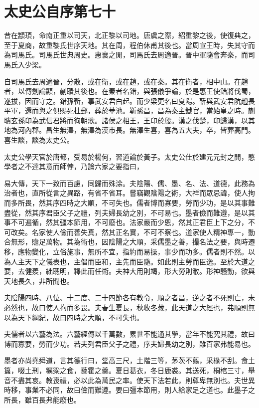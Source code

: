 \chapter{太史公自序第七十}

昔在顓頊，命南正重以司天，北正黎以司地。唐虞之際，紹重黎之後，使復典之，至于夏商，故重黎氏世序天地。其在周，程伯休甫其後也。當周宣王時，失其守而為司馬氏。司馬氏世典周史。惠襄之閒，司馬氏去周適晉。晉中軍隨會奔秦，而司馬氏入少梁。

自司馬氏去周適晉，分散，或在衛，或在趙，或在秦。其在衛者，相中山。在趙者，以傳劍論顯，蒯聵其後也。在秦者名錯，與張儀爭論，於是惠王使錯將伐蜀，遂拔，因而守之。錯孫靳，事武安君白起。而少梁更名曰夏陽。靳與武安君阬趙長平軍，還而與之俱賜死杜郵，葬於華池。靳孫昌，昌為秦主鐵官，當始皇之時。蒯聵玄孫卬為武信君將而徇朝歌。諸侯之相王，王卬於殷。漢之伐楚，卬歸漢，以其地為河內郡。昌生無澤，無澤為漢市長。無澤生喜，喜為五大夫，卒，皆葬高門。喜生談，談為太史公。

太史公學天官於唐都，受易於楊何，習道論於黃子。太史公仕於建元元封之閒，愍學者之不達其意而師悖，乃論六家之要指曰，

易大傳，天下一致而百慮，同歸而殊涂。夫陰陽、儒、墨、名、法、道德，此務為治者也，直所從言之異路，有省不省耳。嘗竊觀陰陽之術，大祥而眾忌諱，使人拘而多所畏，然其序四時之大順，不可失也。儒者博而寡要，勞而少功，是以其事難盡從，然其序君臣父子之禮，列夫婦長幼之別，不可易也。墨者儉而難遵，是以其事不可遍循，然其彊本節用，不可廢也。法家嚴而少恩，然其正君臣上下之分，不可改矣。名家使人儉而善失真，然其正名實，不可不察也。道家使人精神專一，動合無形，贍足萬物。其為術也，因陰陽之大順，采儒墨之善，撮名法之要，與時遷移，應物變化，立俗施事，無所不宜，指約而易操，事少而功多。儒者則不然。以為人主天下之儀表也，主倡而臣和，主先而臣隨。如此則主勞而臣逸。至於大道之要，去健羨，絀聰明，釋此而任術。夫神大用則竭，形大勞則敝。形神騷動，欲與天地長久，非所聞也。

夫陰陽四時、八位、十二度、二十四節各有教令，順之者昌，逆之者不死則亡，未必然也，故曰使人拘而多畏。夫春生夏長，秋收冬藏，此天道之大經也，弗順則無以為天下綱紀，故曰四時之大順，不可失也。

夫儒者以六藝為法。六藝經傳以千萬數，累世不能通其學，當年不能究其禮，故曰博而寡要，勞而少功。若夫列君臣父子之禮，序夫婦長幼之別，雖百家弗能易也。

墨者亦尚堯舜道，言其德行曰，堂高三尺，土階三等，茅茨不翦，采椽不刮。食土簋，啜土刑，糲粱之食，藜霍之羹。夏日葛衣，冬日鹿裘。其送死，桐棺三寸，舉音不盡其哀。教喪禮，必以此為萬民之率。使天下法若此，則尊卑無別也。夫世異時移，事業不必同，故曰儉而難遵。要曰彊本節用，則人給家足之道也。此墨子之所長，雖百長弗能廢也。

